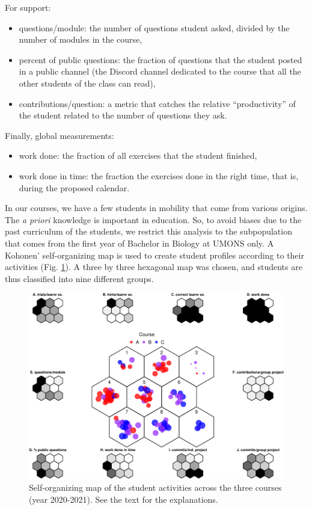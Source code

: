 \documentclass{aims}
\theoremstyle{definition}
\begin{document}
For support:

\begin{itemize}
\item
  questions/module: the number of questions student asked, divided by
  the number of modules in the course,
\item
  percent of public questions: the fraction of questions that the
  student posted in a public channel (the Discord channel dedicated to
  the course that all the other students of the class can read),
\item
  contributions/question: a metric that catches the relative
  ``productivity'' of the student related to the number of questions
  they ask.
\end{itemize}

Finally, global measurements:

\begin{itemize}
\item
  work done: the fraction of all exercises that the student finished,
\item
  work done in time: the fraction the exercises done in the right time,
  that is, during the proposed calendar.
\end{itemize}

In our courses, we have a few students in mobility that come from
various origins. The \emph{a priori} knowledge is important in
education. So, to avoid biases due to the past curriculum of the
students, we restrict this analysis to the subpopulation that comes from
the first year of Bachelor in Biology at UMONS only. A Kohonen'
self-organizing map is used to create student profiles according to
their activities (Fig. \ref {fig:fig_som}). A three by three hexagonal
map was chosen, and students are thus classified into nine different
groups.

\begin{figure}
\includegraphics[width=1\linewidth]{teaching_data_science_files/figure-latex/fig_som-1} \caption{\label{fig:fig_som} Self-organizing map of the student activities across the three courses (year 2020-2021). See the text for the explanations.}\label{fig:fig_som}
\end{figure}
\end{document}
